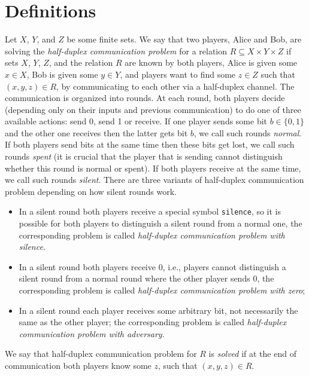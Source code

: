 \section{Definitions}\label{sec:defs}
\begin{definition}
Let $X$, $Y$, and $Z$ be some finite sets. We say that two players, Alice and Bob, are solving the
\emph{half-duplex communication problem} for a relation $R \subseteq X\times Y\times Z$ if sets $X$, $Y$, $Z$, and the
relation $R$ are known by both players, Alice is given some $x\in X$, Bob is given some $y\in Y$,
and players want to find some $z\in Z$ such that $(x,y,z)\in R$, by communicating to each other via a half-duplex channel. 
The communication is organized into rounds. At each round, both players decide 
(depending only on their inputs and previous communication) to
do one of three available actions: send 0, send 1 or receive.
If one player sends some bit $b\in\{0,1\}$ and the other one receives then the latter gets bit $b$, we
call such rounds \emph{normal}.
If both players send bits at the same time then these bits get lost, we call such rounds
\emph{spent} (it is crucial that the player that is sending cannot distinguish whether this round is normal or spent).
If both players receive at the same time, we call such rounds \emph{silent}.
There are three variants of half-duplex communication problem depending
on how silent rounds work.
\begin{itemize}
\item In a silent round both players receive a special symbol \texttt{silence}, so it is possible for both players to distinguish
    a silent round from a normal one, the corresponding problem is called \emph{half-duplex communication problem with silence}.

\item In a silent round both players receive $0$, i.e., players cannot distinguish a silent round from a normal round where the other player sends $0$, the corresponding problem is called 
\emph{half-duplex communication problem with zero};

\item In a silent round each player receives some arbitrary bit, not necessarily the same as the other player; the corresponding problem is called \emph{half-duplex communication problem with adversary}.
\end{itemize}
We say that half-duplex communication problem for $R$ is \emph{solved} if at the end of communication both players know some $z$, such that $(x,y,z)\in R$.
\end{definition} 


